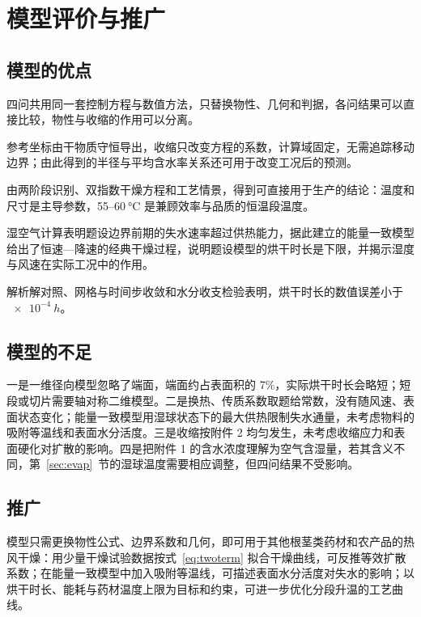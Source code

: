 \section{模型评价与推广}\label{sec:eval}

\subsection{模型的优点}

 四问共用同一套控制方程与数值方法，只替换物性、几何和判据，各问结果可以直接比较，物性与收缩的作用可以分离。

 参考坐标由干物质守恒导出，收缩只改变方程的系数，计算域固定，无需追踪移动边界；由此得到的半径与平均含水率关系还可用于改变工况后的预测。

 由两阶段识别、双指数干燥方程和工艺情景，得到可直接用于生产的结论：温度和尺寸是主导参数，55--$\SI{60}{\celsius}$ 是兼顾效率与品质的恒温段温度。

 湿空气计算表明题设边界前期的失水速率超过供热能力，据此建立的能量一致模型给出了恒速—降速的经典干燥过程，说明题设模型的烘干时长是下限，并揭示湿度与风速在实际工况中的作用。

 解析解对照、网格与时间步收敛和水分收支检验表明，烘干时长的数值误差小于 $\SI{e-4}{h}$。

\subsection{模型的不足}

一是一维径向模型忽略了端面，端面约占表面积的 7\%，实际烘干时长会略短；短段或切片需要轴对称二维模型。二是换热、传质系数取题给常数，没有随风速、表面状态变化；能量一致模型用湿球状态下的最大供热限制失水通量，未考虑物料的吸附等温线和表面水分活度。三是收缩按附件 2 均匀发生，未考虑收缩应力和表面硬化对扩散的影响。四是把附件 1 的含水浓度理解为空气含湿量，若其含义不同，第~\ref{sec:evap}~节的湿球温度需要相应调整，但四问结果不受影响。

\subsection{推广}

模型只需更换物性公式、边界系数和几何，即可用于其他根茎类药材和农产品的热风干燥：用少量干燥试验数据按式~\eqref{eq:twoterm} 拟合干燥曲线，可反推等效扩散系数；在能量一致模型中加入吸附等温线，可描述表面水分活度对失水的影响；以烘干时长、能耗与药材温度上限为目标和约束，可进一步优化分段升温的工艺曲线。
